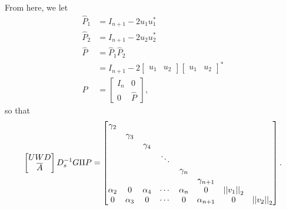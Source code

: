 %
From here, we let
%
\begin{align}
    \widehat{P}_{1} &= I_{n+1} - 2u_{1}u_{1}^{*} \nonumber\\
    \widehat{P}_{2} &= I_{n+1} - 2u_{2}u_{2}^{*} \nonumber\\
    \widehat{P} &= \widehat{P}_{1}\widehat{P}_{2} \nonumber\\
        &= I_{n+1} - 2\begin{bmatrix} u_{1} & u_{2} \end{bmatrix}
                \begin{bmatrix} u_{1} & u_{2} \end{bmatrix}^{*} \nonumber\\
    P &= \begin{bmatrix} I_{n} & 0 \\ 0 & \widehat{P} \end{bmatrix},
\end{align}
%
so that
%
\begin{equation}
    \label{eq:CV_D_1D_2n_E_F2_L_even}
    \begin{bmatrix} UWD \\ \overline{A} \end{bmatrix}D_{s}^{-1}G\Pi P
        = \begin{bmatrix}
            \gamma_{2} & \\
            & \gamma_{3} & \\
            & & \gamma_{4} & \\
            &   &   & \ddots \\
            & & & & \gamma_{n} & \\
            & & & & & \gamma_{n+1} & \\
            \alpha_{2} & 0 & \alpha_{4} & \cdots & \alpha_{n} & 0 &
                \left| \left| v_{1} \right| \right|_{2} \\
            0 & \alpha_{3} & 0 & \cdots & 0 & \alpha_{n+1} &
                0 & \left| \left| v_{2} \right| \right|_{2} \\
            \end{bmatrix}.
\end{equation}

